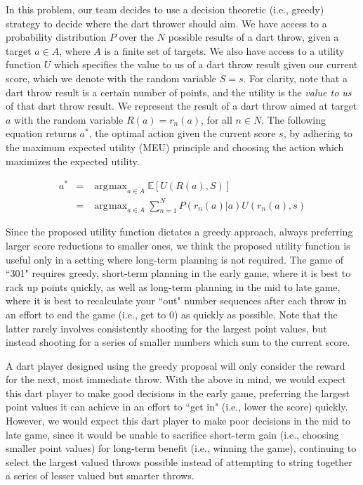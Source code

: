 \documentclass[solution, letterpaper]{cs121}
\DeclareMathOperator*{\argmax}{\arg\!\max}
\begin{document}


\subproblem{}
In this problem, our team decides to use a decision theoretic (i.e., greedy) strategy to decide where the dart thrower should aim. We have access to a probability distribution $P$ over the $N$ possible results of a dart throw, given a target $a \in A$, where $A$ is a finite set of targets. We also have access to a utility function $U$ which specifies the value to us of a dart throw result given our current score, which we denote with the random variable $S = s$. For clarity, note that a dart throw result is a certain number of points, and the utility is the \emph{value to us} of that dart throw result. We represent the result of a dart throw aimed at target $a$ with the random variable $R(a) = r_n(a)$, for all $n \in N$. The following equation returns $a^*$, the optimal action given the current score $s$, by adhering to the maximum expected utility (MEU) principle and choosing the action which maximizes the expected utility.

\begin{eqnarray*}
a^* &=& \argmax_{a \in A} \mathbb{E}\left[U(R(a),S)\right] \\
&=& \argmax_{a \in A} \sum_{n=1}^N P(r_n(a) | a) U(r_n(a),s)
\end{eqnarray*}

\subproblem{}
Since the proposed utility function dictates a greedy approach, always preferring larger score reductions to smaller ones, we think the proposed utility function is useful only in a setting where long-term planning is not required. The game of ``301" requires greedy, short-term planning in the early game, where it is best to rack up points quickly, as well as long-term planning in the mid to late game, where it is best to recalculate your ``out" number sequences after each throw in an effort to end the game (i.e., get to 0) as quickly as possible. Note that the latter rarely involves consistently shooting for the largest point values, but instead shooting for a series of smaller numbers which sum to the current score.

A dart player designed using the greedy proposal will only consider the reward for the next, most immediate throw. With the above in mind, we would expect this dart player to make good decisions in the early game, preferring the largest point values it can achieve in an effort to ``get in" (i.e., lower the score) quickly. However, we would expect this dart player to make poor decisions in the mid to late game, since it would be unable to sacrifice short-term gain (i.e., choosing smaller point values) for long-term benefit (i.e., winning the game), continuing to select the largest valued throws possible instead of attempting to string together a series of lesser valued but smarter throws.








\end{document}
